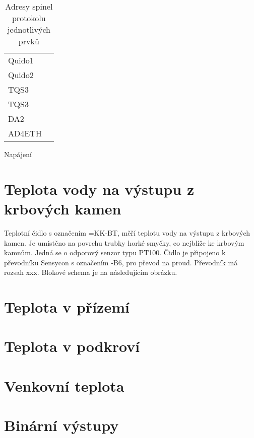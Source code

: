\documentclass[a4paper,draft]{book}
\begin{document}
    \begin{table}
      \centering
      \begin{tabular}{ll}
        Quido1 & \\
        Quido2 & \\
        TQS3   & \\
        TQS3   & \\
        DA2    & \\
        AD4ETH &
      \end{tabular}
      \caption{Adresy spinel protokolu jednotlivých prvků}
    \end{table}

    Napájení

    \section{Teplota vody na výstupu z krbových kamen}

        Teplotní čidlo s označením =KK-BT, měří teplotu vody na
        výstupu z krbových kamen. Je umístěno na povrchu
        trubky horké smyčky, co nejblíže ke krbovým kamnům. Jedná se o odporový
        senzor typu PT100. Čidlo je připojeno k převodníku
        Sensycon s označením -B6, pro převod na
        proud. Převodník má rozsah xxx. Blokové schema je na následujícím
        obrázku.

        \begin{tikzpicture}[scale=1.0]
        \end{tikzpicture}

    \section{Teplota v přízemí}

    \section{Teplota v podkroví}

    \section{Venkovní teplota}

    \section{Binární výstupy}
\end{document}
